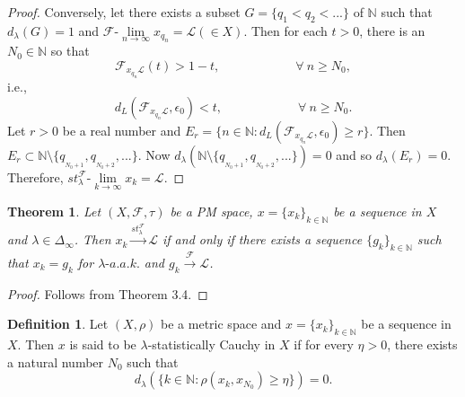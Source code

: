 \documentclass[reqno,b5paper]{amsart}
\theoremstyle{plain}
\newtheorem{thm}{Theorem}[section]
\theoremstyle{definition}
\newtheorem{defn}{Definition}[section]
\begin{document}
\begin{proof}
Conversely, let there exists a subset $G=\{q_1<q_2<...\}$ of
$\mathbb{N}$ such that $d_\lambda(G)=1$ and
$\mathcal{F}\mbox{-}\lim\limits_{n\rightarrow\infty}x_{q_n}=\mathcal{L}(\in
X)$. Then for each $t>0$, there is an $N_0\in\mathbb{N}$ so that
$$ \mathcal{F}_{x_{q_n}\mathcal{L}}(t)>1-t, \hspace{1in} \forall~ n\geq N_0,$$
i.e.,
$$d_L(\mathcal{F}_{x_{q_n}\mathcal{L}},\epsilon_0)<t, \hspace{1in} \forall~ n\geq N_0.$$
Let $r>0$ be a real number and $E_r=\{n\in
\mathbb{N}:d_L(\mathcal{F}_{x_{q_n}\mathcal{L}},\epsilon_0)\geq
r\}$. Then $E_r\subset\mathbb{N} \setminus \{q_{ _{N_0+1}},q_{
_{N_0+2}},...\}$. Now $d_\lambda(\mathbb{N} \setminus \{q_{
_{N_0+1}}, q_{ _{N_0+2}},...\}) = 0$ and so $d_\lambda(E_r)=0$.
Therefore,
$st^\mathcal{F}_\lambda\mbox{-}\lim\limits_{k\rightarrow\infty}x_k=\mathcal{L}$.
\end{proof}
\begin{thm}
Let $(X,\mathcal{F},\tau)$ be a PM space, $x=\{x_k\}_{k \in
\mathbb{N}}$ be a sequence in $X$ and $\lambda\in\Delta_\infty$.
Then $x_k\xrightarrow{st^\mathcal{F}_{\lambda}}\mathcal{L}$ if and
only if there exists a sequence $\{g_k\}_{k\in\mathbb{N}}$ such
that $x_k=g_k$ for $\lambda\mbox{-}a.a.k.$ and
$g_k\xrightarrow{\mathcal{F}}\mathcal{L}$.
\end{thm}
\begin{proof}
Follows from Theorem 3.4.
\end{proof}
\begin{defn}
Let $(X,\rho)$ be a metric space and $x=\{x_k\}_{k\in\mathbb{N}}$
be a sequence in $X$. Then $x$ is said to be
$\lambda$-statistically Cauchy in $X$ if for every $\eta>0$, there
exists a natural number $N_0$ such that
$$d_\lambda(\{k\in\mathbb{N}:\rho(x_k,x_{N_0})\geq\eta\})=0.$$
\end{defn}
\end{document}
